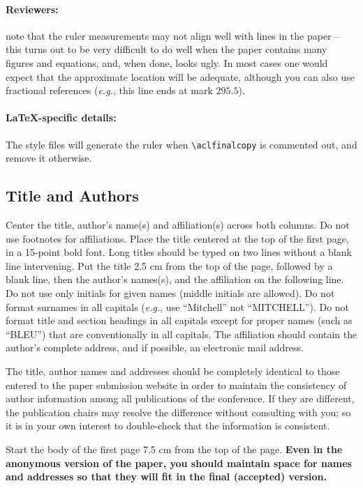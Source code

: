 \documentclass[11pt,a4paper]{article}
\begin{document}
\paragraph{Reviewers:}
note that the ruler measurements may not align well with lines in the paper -- this turns out to be very difficult to do well when the paper contains many figures and equations, and, when done, looks ugly.
In most cases one would expect that the approximate location will be adequate, although you can also use fractional references (\emph{e.g.}, this line ends at mark $295.5$).

\paragraph{\LaTeX-specific details:}
The style files will generate the ruler when {\small\verb|\aclfinalcopy|} is commented out, and remove it otherwise.

\subsection{Title and Authors}
\label{ssec:title-authors}

Center the title, author's name(s) and affiliation(s) across both columns.
Do not use footnotes for affiliations.
Place the title centered at the top of the first page, in a 15-point bold font.
Long titles should be typed on two lines without a blank line intervening.
Put the title 2.5 cm from the top of the page, followed by a blank line, then the author's names(s), and the affiliation on the following line.
Do not use only initials for given names (middle initials are allowed).
Do not format surnames in all capitals (\emph{e.g.}, use ``Mitchell'' not ``MITCHELL'').
Do not format title and section headings in all capitals except for proper names (such as ``BLEU'') that are
conventionally in all capitals.
The affiliation should contain the author's complete address, and if possible, an electronic mail address.

The title, author names and addresses should be completely identical to those entered to the paper submission website in order to maintain the consistency of author information among all publications of the conference.
If they are different, the publication chairs may resolve the difference without consulting with you; so it is in your own interest to double-check that the information is consistent.

Start the body of the first page 7.5 cm from the top of the page.
\textbf{Even in the anonymous version of the paper, you should maintain space for names and addresses so that they will fit in the final (accepted) version.}
\end{document}
